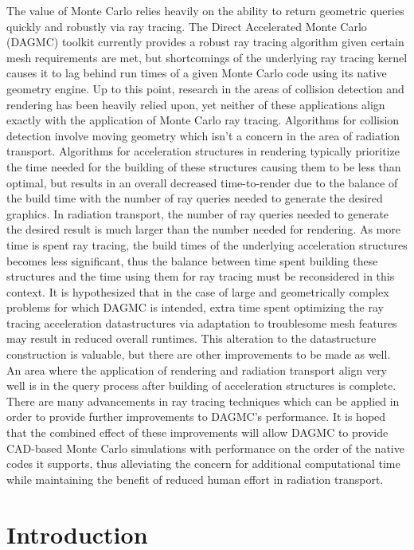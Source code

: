 \documentclass[12pt, a4paper]{article}
\begin{document}
The value of Monte Carlo relies heavily on the ability to return geometric queries quickly and robustly via ray tracing. The Direct Accelerated Monte Carlo (DAGMC) toolkit currently provides a robust ray tracing algorithm\cite{Smith_2011} given certain mesh requirements are met, but shortcomings of the underlying ray tracing kernel causes it to lag behind run times of a given Monte Carlo code using its native geometry engine. Up to this point, research in the areas of collision detection and rendering has been heavily relied upon, yet neither of these applications align exactly with the application of Monte Carlo ray tracing. Algorithms for collision detection involve moving geometry which isn’t a concern in the area of radiation transport. Algorithms for acceleration structures in rendering typically prioritize the time needed for the building of these structures causing them to be less than optimal, but results in an overall decreased time-to-render due to the balance of the build time with the number of ray queries needed to generate the desired graphics. In radiation transport, the number of ray queries needed to generate the desired result is much larger than the number needed for rendering. As more time is spent ray tracing, the build times of the underlying acceleration structures becomes less significant, thus the balance between time spent building these structures and the time using them for ray tracing must be reconsidered in this context. It is hypothesized that in the case of large and geometrically complex problems for which DAGMC is intended, extra time spent optimizing the ray tracing acceleration datastructures via adaptation to troublesome mesh features may result in reduced overall runtimes. This alteration to the datastructure construction is valuable, but there are other improvements to be made as well. An area where the application of rendering and radiation transport align very well is in the query process after building of acceleration structures is complete. There are many advancements in ray tracing techniques which can be applied in order to provide further improvements to DAGMC’s performance. It is hoped that the combined effect of these improvements will allow DAGMC to provide CAD-based Monte Carlo simulations with performance on the order of the native codes it supports, thus alleviating the concern for additional computational time while maintaining the benefit of reduced human effort in radiation transport.

\section{Introduction}%
\end{document}
